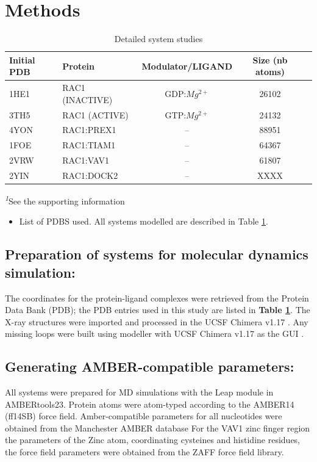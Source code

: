 \documentclass[12pt, a4paper]{achemso}
\begin{document}
\section{Methods}

\begin{table}
  \caption{Detailed system studies}
  \label{tbl: Detailed system studies}
  \begin{tabular}{llccc}
    \hline
   \textbf{Initial PDB} & \textbf{Protein} & \textbf{Modulator/LIGAND} & \textbf{Size (nb atoms)} \\
    \hline
    1HE1\cite{gappdb} & RAC1 (INACTIVE) & GDP:$Mg^{2+}$ & 26102 \\
    3TH5\cite{activeRAC1}   & RAC1 (ACTIVE) &  GTP:$Mg^{2+}$ & 24132  \\
    4YON\cite{prex1pdb} & RAC1:PREX1    & -- & 88951 \\
    1FOE\cite{tiam1pdb} & RAC1:TIAM1     & -- & 64367 \\
    2VRW\cite{vav1pdb} & RAC1:VAV1      & -- & 61807 \\
    2YIN\cite{dock2pdb} & RAC1:DOCK2      & -- & XXXX \\
    \hline
  \end{tabular}
  
  \textsuperscript{\emph{1}}See the supporting information
\end{table}


\begin{itemize}
    \item List of PDBS used. All systems modelled are described in Table \ref{tbl: Detailed system studies}. 
\end{itemize}

\subsection{Preparation of systems for molecular dynamics simulation:} 
    The coordinates for the protein-ligand complexes were retrieved from the Protein Data Bank (PDB); the PDB entries used in this study are listed in \textbf{Table \ref{tbl: Detailed system studies}}. The X-ray structures were imported and processed in the UCSF Chimera v1.17 \cite{pettersen2004ucsf}. Any missing loops were built using modeller \cite{fiser2003modeller} with  UCSF Chimera v1.17 as the GUI \cite{yang2012ucsf, huang2014enhancing}. 


\subsection{Generating AMBER-compatible parameters:} 
 All systems were prepared for MD simulations with the Leap module in AMBERtools23. Protein atoms were atom-typed according to the AMBER14 (ff14SB) force field.  Amber-compatible parameters for all nucleotides were obtained from the Manchester AMBER database  For the VAV1 zinc finger region the parameters of the Zinc atom, coordinating cysteines and histidine residues, the force field parameters were obtained from the ZAFF\cite{zaff} force field library.
\end{document}
